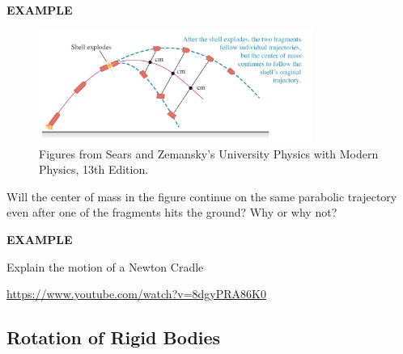 \documentclass[]{beamer}
\begin{document}
\begin{frame}
\begin{columns}[c]
          
        
            
        \end{columns}
        
             \end{frame}




\begin{frame}
    \textbf{EXAMPLE}
     \vspace{7mm}


     \begin{figure}[h!]  
        \includegraphics[width=0.8\textwidth]{images/10.jpg}
        \caption{ {\tiny Figures from Sears and Zemansky's University Physics 
        with Modern Physics, 13th Edition.} }
      \end{figure}

\pause
\vspace{7mm}


Will the center of mass in the figure
continue on the same parabolic trajectory even after one of the fragments hits the ground?
Why or why not?

     \end{frame}


\begin{frame}
    \textbf{EXAMPLE}
     \vspace{7mm}

    Explain the motion of a Newton Cradle
    
    \vspace{7mm}
        
    \url{https://www.youtube.com/watch?v=8dgyPRA86K0}
        
  \end{frame}

\subsection{Rotation of Rigid Bodies}
\end{document}
